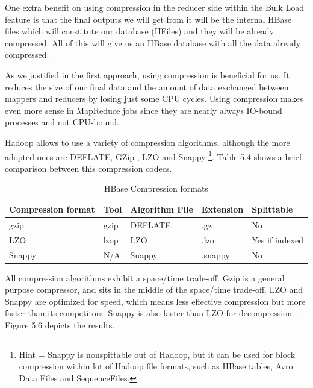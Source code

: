 One extra benefit on using compression in the reducer side within the Bulk Load feature is that the final outputs we will get from it will be the internal HBase files which will constitute our database (HFiles) and they will be already compressed. All of this will give us an HBase database with all the data already compressed.
\par
As we justified in the first approach, using compression is beneficial for us. It reduces the size of our final data and the amount of data exchanged between mappers and reducers by losing just some CPU cycles. Using compression makes even more sense in MapReduce jobs since they are nearly always IO-bound processes and not CPU-bound.
\bigskip
\par
Hadoop allows to use a variety of compression algorithms, although the more adopted ones are DEFLATE, GZip \cite{GZip}, LZO \cite{oberhumer2005lzo} and Snappy \cite{Snappy} \footnote{Hint = Snappy is nonspittable out of Hadoop, but it can be used for block compression within lot of Hadoop file formats, such as HBase tables, Avro Data Files and SequenceFiles.}. Table 5.4 shows a brief comparison between this compression codecs.
\begin{table}[htbp]

\begin{tabular}{|l|l|l|l|l|}
\hline
Compression format  & Tool  & Algorithm File  & Extension  & Splittable \\ \hline
gzip &  gzip  & DEFLATE  & .gz &  No \\ \hline
LZO &  lzop &  LZO  & .lzo &  Yes if indexed \\ \hline
Snappy  & N/A  & Snappy  & .snappy  & No \\ \hline
\end{tabular}
\label{}
\caption{HBase Compression formats}
\end{table}


All compression algorithms exhibit a space/time trade-off. Gzip is a general purpose compressor, and sits in the middle of the space/time trade-off. LZO and Snappy are optimized for speed, which means less effective compression but more faster than its competitors. Snappy is also faster than LZO for decompression \cite{CompressionHadoop}. Figure 5.6 depicts the results.



